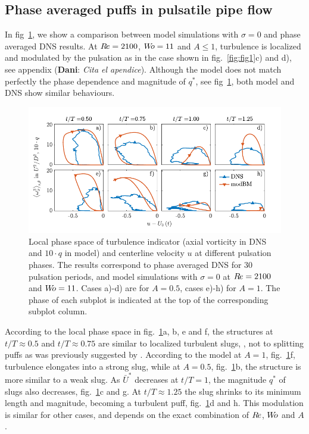 \documentclass{article}
\DeclareRobustCommand{\dm}[1]{{\color{blue}(\textbf{Dani}: \textit{#1}\xspace)}}
\DeclareRobustCommand{\Reynolds}{\ensuremath{R\hspace{-0.1em}e}\xspace}     %
\DeclareRobustCommand{\Womersley}{\ensuremath{W\hspace{-0.25em}o}\xspace}    %
\DeclareRobustCommand{\Amplitude}{\ensuremath{A}\xspace}    %
\begin{document}
\subsection{Phase averaged puffs in pulsatile pipe flow}
In fig~\ref{fig:fig2}, we show a comparison between model simulations with $\sigma=0$ and phase averaged DNS results. At $\Reynolds=2100$, $\Womersley=11$ and $\Amplitude\leq 1$, turbulence is localized and modulated by the pulsation as in the case shown in fig.~\ref{fig:fig1}c) and d), see appendix \dm{Cita el apendice}. Although the model does not match perfectly the phase dependence and magnitude of $q^{*}$, see fig~\ref{fig:fig2}, both model and DNS show similar behaviours.

\begin{figure}
\centering
\includegraphics[width=\textwidth, trim=0mm 0mm 0mm 0mm, clip=true]{Figures9/Fig2.pdf}
\caption{Local phase space of turbulence indicator (axial vorticity in DNS and $10 \cdot q$ in model) and centerline velocity $u$ at different pulsation phases. The results correspond to phase averaged DNS for $30$ pulsation periods, and model simulations with $\sigma=0$ at $\Reynolds=2100$ and $\Womersley=11$. Cases a)-d) are for $\Amplitude=0.5$, cases e)-h) for $\Amplitude=1$. The phase of each subplot is indicated at the top of the corresponding subplot column.}
\label{fig:fig2}
\end{figure}

According to the local phase space in fig.~\ref{fig:fig2}a, b, e and f, the structures at $t/T\approx0.5$ and $t/T\approx0.75$ are similar to localized turbulent slugs, \cite{Song2017,barkley2016}, not to splitting puffs as was previously suggested by \cite{entropy2021}. According to the model at $\Amplitude=1$, fig.~\ref{fig:fig2}f, turbulence elongates into a strong slug, while at $\Amplitude=0.5$, fig.~\ref{fig:fig2}b, the structure is more similar to a weak slug. As $\bar{U}^{*}$ decreases at $t/T=1$, the magnitude $q^{*}$ of slugs also decreases, fig.~\ref{fig:fig2}c and g. At $t/T\approx 1.25$ the slug shrinks to its minimum length and magnitude, becoming a turbulent puff, fig.~\ref{fig:fig2}d and h. This modulation is similar for other cases, and depends on the exact combination of \Reynolds, \Womersley and \Amplitude.
\end{document}
